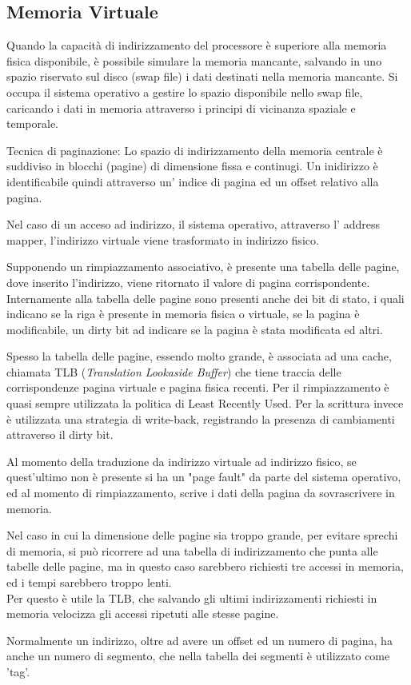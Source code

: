 \documentclass[../template]{subfiles}
\begin{document}
\subsection{Memoria Virtuale}

Quando la capacità di indirizzamento del processore è superiore alla memoria fisica disponibile, è possibile simulare la memoria mancante, salvando in uno spazio riservato sul disco (swap file) i dati destinati nella memoria mancante.
Si occupa il sistema operativo a gestire lo spazio disponibile nello swap file, caricando i dati in memoria attraverso i principi di vicinanza spaziale e temporale.



Tecnica di paginazione:
Lo spazio di indirizzamento della memoria centrale è suddiviso in blocchi (pagine) di dimensione fissa e continugi.
Un inidirizzo è identificabile quindi attraverso un' indice di pagina ed un offset relativo alla pagina.

Nel caso di un acceso ad indirizzo, il sistema operativo, attraverso l' address mapper, l'indirizzo virtuale viene trasformato in indirizzo fisico.

Supponendo un rimpiazzamento associativo, è presente una tabella delle pagine, dove inserito l'indirizzo, viene ritornato il valore di pagina corrispondente. Internamente alla tabella delle pagine sono presenti anche dei bit di stato, i quali indicano se la riga è presente in memoria fisica o virtuale, se la pagina è modificabile, un dirty bit ad indicare se la pagina è stata modificata ed altri.

Spesso la tabella delle pagine, essendo molto grande, è associata ad una cache, chiamata TLB (\textit{Translation Lookaside Buffer}) che tiene traccia delle corrispondenze pagina virtuale e pagina fisica recenti.
Per il rimpiazzamento è quasi sempre utilizzata la politica di Least Recently Used. Per la scrittura invece è utilizzata una strategia di write-back, registrando la presenza di cambiamenti attraverso il dirty bit.

Al momento della traduzione da indirizzo virtuale ad indirizzo fisico, se quest'ultimo non è presente si ha un "page fault" da parte del sistema operativo, ed al momento di rimpiazzamento, scrive i dati della pagina da sovrascrivere in memoria.

Nel caso in cui la dimensione delle pagine sia troppo grande, per evitare sprechi di memoria, si può ricorrere ad una tabella di indirizzamento che punta alle tabelle delle pagine, ma in questo caso sarebbero richiesti tre accessi in memoria, ed i tempi sarebbero troppo lenti.
\\
Per questo è utile la TLB, che salvando gli ultimi indirizzamenti richiesti in memoria velocizza gli accessi ripetuti alle stesse pagine.

Normalmente un indirizzo, oltre ad avere un offset ed un numero di pagina, ha anche un numero di segmento, che nella tabella dei segmenti è utilizzato come 'tag'.
\end{document}
